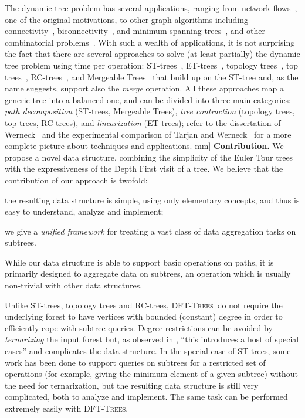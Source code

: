\documentclass[a4paper,USenglish]{lipics}
\newcommand{\dfts}{\textsc{DFT-Trees}}
\newcommand{\runinsec}[1]{\noindent\textbf{\textsf{#1}}\quad}
\begin{document}
The dynamic tree problem has several applications, ranging from network flows~\cite{AMO93,GGT91,ST85,Tar97}, one of the original motivations, to other graph algorithms including connectivity~\cite{HK99}, biconnectivity~\cite{Fre83}, and minimum spanning trees~\cite{HK99,Fre85}, and other combinatorial problems~\cite{KMT03,Lan00}. 
With such a wealth of applications, it is not surprising the fact that there are several approaches to solve (at least partially) the dynamic tree problem using  time per operation: ST-trees~\cite{ST83,ST85}, ET-trees~\cite{HK99,Tar97}, topology trees~\cite{Fre85,Fre97a,Fre97b}, top trees~\cite{AHLT97,AHLT05,TW05}, RC-trees~\cite{ABV04,ABV05}, and Mergeable Trees~\cite{GKSTW11} that build up on the ST-tree and, as the name suggests, support also the \emph{merge} operation. All these approaches map a generic tree into a balanced one, and can be divided into three main categories: \emph{path decomposition} (ST-trees, Mergeable Trees), \emph{tree contraction} (topology trees, top trees, RC-trees), and \emph{linearization} (ET-trees);  refer to the dissertation of Werneck~\cite{Wer06} and the experimental comparison of Tarjan and Werneck~\cite{TW09} for a more complete picture about techniques and applications.
\3mm]
\runinsec{Contribution.}
We propose a novel data structure, combining the simplicity of the Euler Tour trees with the expressiveness of the Depth First visit of a tree. We believe that the contribution of our approach is twofold:
\begin{compactitem}
	\item the resulting data structure is simple, using only elementary concepts, and thus is easy to understand, analyze and implement;
	\item we give a \emph{unified framework} for treating a vast class of data aggregation tasks on subtrees.
\end{compactitem}
While our data structure is able to support basic operations on paths, it is primarily designed to aggregate data on subtrees, an operation which is usually non-trivial with other data structures.

Unlike ST-trees, topology trees and RC-trees, \dfts\ do not require the underlying forest to have vertices with bounded (constant) degree in order to efficiently cope with subtree queries. Degree restrictions can be avoided by \emph{ternarizing} the input forest but, as observed in \cite{Wer08}, ``this introduces a host of special cases'' and complicates the data structure. In the special case of ST-trees, some work has been done \cite{Radzik98implementationof} to support queries on subtrees {for a restricted set of operations} (for example, giving the minimum element of a given subtree) without the need for ternarization, but the resulting data structure is still very complicated, both to analyze and implement. The same task can be performed extremely easily with \dfts.
\end{document}
